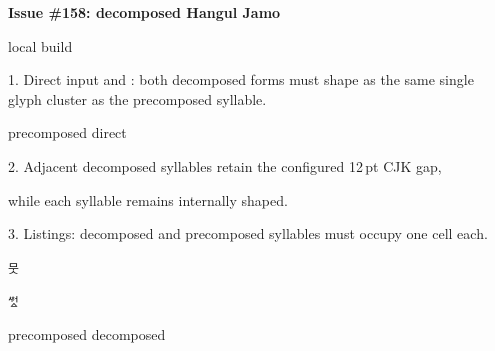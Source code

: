 \documentclass{article}
\providecommand\BuildLabel{local build}
\begin{document}
{\Large\bfseries Issue \#158: decomposed Hangul Jamo}\par
{\small \BuildLabel}\par\bigskip

{\large 1. Direct input and \texttt{\string\CJKsymbol}: both decomposed forms
must shape as the same single glyph cluster as the precomposed syllable.}\par\medskip
\sbox{}
\sbox{}
\begin{center}
  precomposed \quad
  direct \fbox{\usebox\DirectJamoBox}\quad
  \texttt{\string\CJKsymbol} \fbox{\usebox\CJKsymbolBox}
\end{center}

{\large 2. Adjacent decomposed syllables retain the configured 12\,pt CJK gap,\par
while each syllable remains internally shaped.}\par\medskip
\begin{center}
\end{center}

{\large 3. Listings: decomposed and precomposed syllables must occupy one cell each.}\par\medskip
\begin{lrbox}{\PrecomposedBox}\lstinline|뭇|\end{lrbox}
\begin{lrbox}{\DecomposedBox}\lstinline|ᄻᆟᇫ|\end{lrbox}
\begin{center}
  precomposed \fbox{\usebox\PrecomposedBox}\qquad
  decomposed \fbox{\usebox\DecomposedBox}
\end{center}
\end{document}
